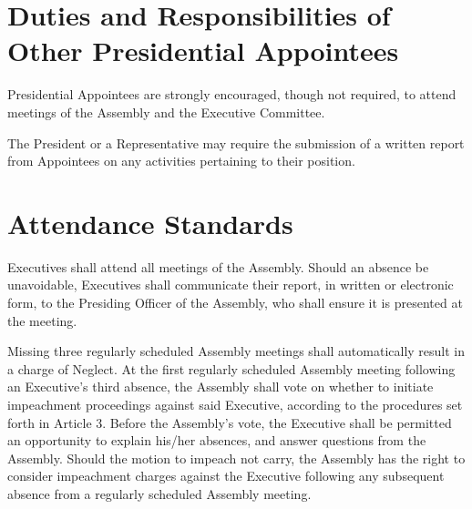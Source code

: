 \section{Duties and Responsibilities of Other Presidential Appointees}
\begin{bylaws-number}
  \item Presidential Appointees are strongly encouraged, though not required, to attend meetings of the Assembly and the Executive Committee.
  \item The President or a Representative may require the submission of a written report from Appointees on any activities pertaining to their position.
\end{bylaws-number}

\section{Attendance Standards}
\begin{bylaws-number}
  \item Executives shall attend all meetings of the Assembly. Should an absence be unavoidable, Executives shall communicate their report, in written or electronic form, to the Presiding Officer of the Assembly, who shall ensure it is presented at the meeting.
  \item Missing three regularly scheduled Assembly meetings shall automatically result in a charge of Neglect. At the first regularly scheduled Assembly meeting following an Executive’s third absence, the Assembly shall vote on whether to initiate impeachment proceedings against said Executive, according to the procedures set forth in Article 3. Before the Assembly’s vote, the Executive shall be permitted an opportunity to explain his/her absences, and answer questions from the Assembly. Should the motion to impeach not carry, the Assembly has the right to consider impeachment charges against the Executive following any subsequent absence from a regularly scheduled Assembly meeting.
\end{bylaws-number}